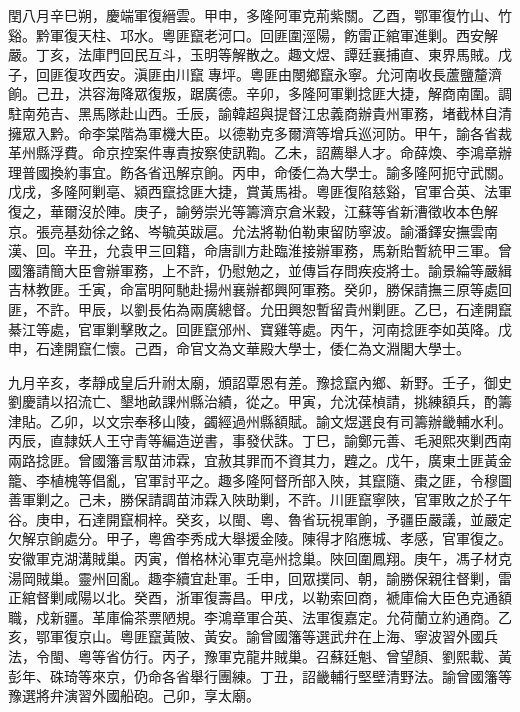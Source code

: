 \begin{pinyinscope}
閏八月辛巳朔，慶端軍復縉雲。甲申，多隆阿軍克荊紫關。乙酉，鄂軍復竹山、竹谿。黔軍復天柱、邛水。粵匪竄老河口。回匪圍涇陽，飭雷正綰軍進剿。西安解嚴。丁亥，法庫門回民互斗，玉明等解散之。趣文煜、譚廷襄捕直、東界馬賊。戊子，回匪復攻西安。滇匪由川竄專坪。粵匪由閿鄉竄永寧。允河南收長蘆鹽釐濟餉。己丑，洪容海降眾復叛，踞廣德。辛卯，多隆阿軍剿捻匪大捷，解商南圍。調駐南苑吉、黑馬隊赴山西。壬辰，諭韓超與提督江忠義商辦貴州軍務，堵截林自清擁眾入黔。命李棠階為軍機大臣。以德勒克多爾濟等增兵巡河防。甲午，諭各省裁革州縣浮費。命京控案件專責按察使訊鞫。乙未，詔薦舉人才。命薛煥、李鴻章辦理普國換約事宜。飭各省迅解京餉。丙申，命倭仁為大學士。諭多隆阿扼守武關。戊戌，多隆阿剿亳、潁西竄捻匪大捷，賞黃馬褂。粵匪復陷慈谿，官軍合英、法軍復之，華爾沒於陣。庚子，諭勞崇光等籌濟京倉米穀，江蘇等省新漕徵收本色解京。張亮基劾徐之銘、岑毓英跋扈。允法將勒伯勒東留防寧波。諭潘鐸安撫雲南漢、回。辛丑，允袁甲三回籍，命唐訓方赴臨淮接辦軍務，馬新貽暫統甲三軍。曾國籓請簡大臣會辦軍務，上不許，仍慰勉之，並傳旨存問疾疫將士。諭景綸等嚴緝吉林教匪。壬寅，命富明阿馳赴揚州襄辦都興阿軍務。癸卯，勝保請撫三原等處回匪，不許。甲辰，以劉長佑為兩廣總督。允田興恕暫留貴州剿匪。乙巳，石達開竄綦江等處，官軍剿擊敗之。回匪竄邠州、寶雞等處。丙午，河南捻匪李如英降。戊申，石達開竄仁懷。己酉，命官文為文華殿大學士，倭仁為文淵閣大學士。

九月辛亥，孝靜成皇后升祔太廟，頒詔覃恩有差。豫捻竄內鄉、新野。壬子，御史劉慶請以招流亡、墾地畝課州縣治績，從之。甲寅，允沈葆楨請，挑練額兵，酌籌津貼。乙卯，以文宗奉移山陵，蠲經過州縣額賦。諭文煜選良有司籌辦畿輔水利。丙辰，直隸妖人王守青等編造逆書，事發伏誅。丁巳，諭鄭元善、毛昶熙夾剿西南兩路捻匪。曾國籓言馭苗沛霖，宜赦其罪而不資其力，韙之。戊午，廣東土匪黃金籠、李植槐等倡亂，官軍討平之。趣多隆阿督所部入陜，其竄隨、棗之匪，令穆圖善軍剿之。己未，勝保請調苗沛霖入陜助剿，不許。川匪竄寧陜，官軍敗之於子午谷。庚申，石達開竄桐梓。癸亥，以閩、粵、魯省玩視軍餉，予疆臣嚴議，並嚴定欠解京餉處分。甲子，粵酋李秀成大舉援金陵。陳得才陷應城、孝感，官軍復之。安徽軍克湖溝賊巢。丙寅，僧格林沁軍克亳州捻巢。陜回圍鳳翔。庚午，馮子材克湯岡賊巢。靈州回亂。趣李續宜赴軍。壬申，回眾撲同、朝，諭勝保親往督剿，雷正綰督剿咸陽以北。癸酉，浙軍復壽昌。甲戌，以勒索回商，褫庫倫大臣色克通額職，戍新疆。革庫倫茶票陋規。李鴻章軍合英、法軍復嘉定。允荷蘭立約通商。乙亥，鄂軍復京山。粵匪竄黃陂、黃安。諭曾國籓等選武弁在上海、寧波習外國兵法，令閩、粵等省仿行。丙子，豫軍克龍井賊巢。召蘇廷魁、曾望顏、劉熙載、黃彭年、硃琦等來京，仍命各省舉行團練。丁丑，詔畿輔行堅壁清野法。諭曾國籓等豫選將弁演習外國船砲。己卯，享太廟。


\end{pinyinscope}
